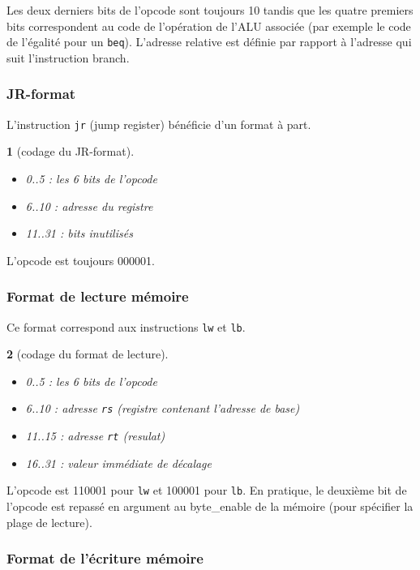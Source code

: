 \documentclass[13pt]{article}
\newtheorem{format}{  }
\begin{document}
Les deux derniers bits de l'opcode sont toujours 10 tandis que
les quatre premiers bits correspondent au code de l'opération de 
l'ALU associée (par exemple le code de l'égalité pour un \texttt{beq}).
L'adresse relative est définie par rapport à l'adresse qui suit 
l'instruction branch.


\subsubsection{JR-format}

L'instruction \texttt{jr} (jump register) bénéficie d'un format à part.

\begin{format}[codage du JR-format]
  \begin{itemize}
  \item 0..5 : les 6 bits de l'opcode
  \item 6..10 : adresse du registre
  \item 11..31 : bits inutilisés
  \end{itemize}
\end{format}

L'opcode est toujours 000001.


\subsubsection{Format de lecture mémoire}

Ce format correspond aux instructions \texttt{lw} et \texttt{lb}.

\begin{format}[codage du format de lecture]
  \begin{itemize}
  \item 0..5 : les 6 bits de l'opcode
  \item 6..10 : adresse \texttt{rs} (registre contenant l'adresse de base) 
  \item 11..15 : adresse \texttt{rt} (resulat)
  \item 16..31 : valeur immédiate de décalage
  \end{itemize}
\end{format}

L'opcode est 110001 pour \texttt{lw} et 100001 pour \texttt{lb}. En pratique, 
le deuxième bit de l'opcode est repassé en argument au byte\_enable
de la mémoire (pour spécifier la plage de lecture).
 
\subsubsection{Format de l'écriture mémoire}
\end{document}
